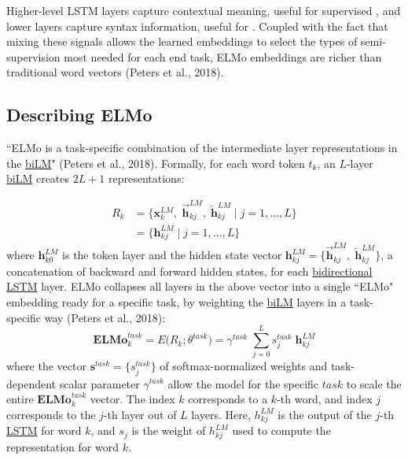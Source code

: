 Higher-level LSTM layers capture contextual meaning, useful for supervised , and lower layers capture syntax information, useful for . Coupled with the fact that mixing these signals allows the learned embeddings to select the types of semi-supervision most needed for each end task, ELMo embeddings are richer than traditional word vectors (Peters et al., 2018). 


\subsection{Describing ELMo} 

``ELMo is a task-specific combination of the intermediate layer representations in the \hyperref[sec:BidirectionalLM]{biLM}" (Peters et al., 2018). Formally, for each word token $t_k$, an $L$-layer \hyperref[sec:BidirectionalLM]{biLM} creates $2L + 1$ representations: 

$$
\begin{array}{ll}
R_k 
&= \Big \{ \mathbf{x}_k^{LM}, \; \overrightarrow{\mathbf{h}}_{kj}^{LM}, \; \overleftarrow{\mathbf{h}}_{kj}^{LM} \; | \; j = 1,...,L \Big \} \\
&= \Big \{ \mathbf{h}_{kj}^{LM} \; | \; j = 1,...,L \Big \}
\end{array}
$$
where $\mathbf{h}_{k0}^{LM}$ is the token layer and the hidden state vector $\mathbf{h}_{kj}^{LM} = \Big \{ \overrightarrow{\mathbf{h}}_{kj}^{LM}, \; \overleftarrow{\mathbf{h}}_{kj}^{LM}  \}$, a concatenation of backward and forward hidden states, for each \hyperref[sec:BidirectionalLM]{bidirectional} \hyperref[sec:LSTM]{LSTM} layer. ELMo collapses all layers in the above vector into a single ``ELMo" embedding ready for a specific task, by weighting the \hyperref[sec:BidirectionalLM]{biLM} layers in a task-specific way (Peters et al., 2018): 
$$
\textbf{ELMo}_k^{task} = E \Big( R_k; \theta^{task} \Big) = \gamma^{task} \; \sum_{j=0}^L s_j^{task} \; \mathbf{h}_{kj}^{LM}
$$
where the vector $\mathbf{s}^{task} = \Big\{ s_j^{task} \Big\}$ of softmax-normalized weights and task-dependent scalar parameter $\gamma^{task}$ allow the model for the specific $task$ to scale the entire $\textbf{ELMo}_k^{task}$ vector. The index $k$ corresponds to a $k$-th word, and index $j$ corresponds to the $j$-th layer out of $L$ layers. Here, $h_{kj}^{LM}$ is the output of the $j$-th \hyperref[sec:LSTM]{LSTM} for word $k$, and $s_j$ is the weight of $h_{kj}^{LM}$ used to compute the representation for word $k$.   

